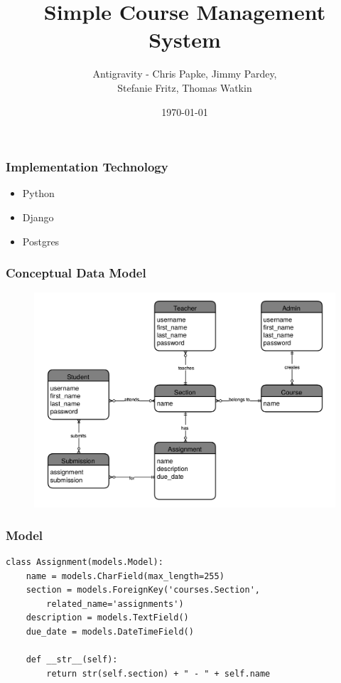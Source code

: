 \documentclass{beamer}
\begin{document}
\title[Group Project]{Simple Course Management System}
\author{Antigravity - Chris Papke, Jimmy Pardey, \\Stefanie Fritz, Thomas Watkin}
\date{\today}

\begin{frame}[plain]
\titlepage
\end{frame}

\begin{frame}[fragile]
\frametitle{Implementation Technology}
\begin{itemize}
	\item Python
	\item Django
	\item Postgres
\end{itemize}
\end{frame}

\begin{frame}[fragile]
\frametitle{Conceptual Data Model}

\begin{figure}
	\includegraphics[width=\textwidth]{concept.png}
\end{figure}
\end{frame}


\begin{frame}[fragile]
\frametitle{Model}

\begin{lstlisting}[basicstyle=\small]
class Assignment(models.Model):
    name = models.CharField(max_length=255)
    section = models.ForeignKey('courses.Section', 
        related_name='assignments')
    description = models.TextField()
    due_date = models.DateTimeField()

    def __str__(self):
        return str(self.section) + " - " + self.name
\end{lstlisting}
\end{frame}
\end{document}
